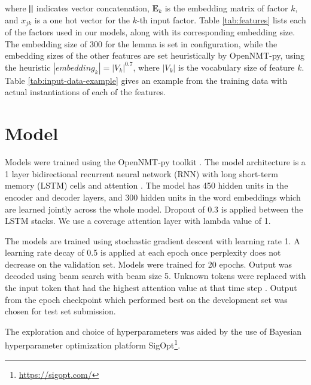 \documentclass[11pt,a4paper]{article}
\begin{document}
\noindent where $ \bigparallel $ indicates vector concatenation, $ \mathbf{E}_{k} $ is the embedding matrix of factor $ k $, and $ x_{jk} $ is a one hot vector for the $k$-th input factor. Table \ref{tab:features} lists each of the factors used in our models, along with its corresponding embedding size. The embedding size of 300 for the lemma is set in configuration, while the embedding sizes of the other features are set heuristically by OpenNMT-py, using the heuristic $ |embedding_{k}| = |V_{k}|^{0.7} $, where $ |V_{k}| $ is the vocabulary size of feature $ k $. Table \ref{tab:input-data-example} gives an example from the training data with actual instantiations of each of the features. 

\section{Model}

Models were trained using the OpenNMT-py toolkit \citep{Klein2017}. The model architecture is a 1 layer bidirectional recurrent neural network (RNN) with long short-term memory (LSTM) cells \citep{Hochreiter1997} and attention \citep{Luong2015EffectiveTranslation}. The model has 450 hidden units in the encoder and decoder layers, and 300 hidden units in the word embeddings which are learned jointly across the whole model. Dropout of 0.3 is applied between the LSTM stacks. We use a coverage attention layer \citep{Tu2016ModelingTranslation} with lambda value of 1.

The models are trained using stochastic gradient descent with learning rate 1. A learning rate decay of 0.5 is applied at each epoch once perplexity does not decrease on the validation set. Models were trained for 20 epochs. Output was decoded using beam search with beam size 5. Unknown tokens were replaced with the input token that had the highest attention value at that time step \citep{Vinyals2015}. Output from the epoch checkpoint which performed best on the development set was chosen for test set submission. 

The exploration and choice of hyperparameters was aided by the use of Bayesian hyperparameter optimization platform SigOpt\footnote{\url{https://sigopt.com/}}. 


\end{document}

